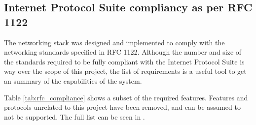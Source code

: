 \subsection{Internet Protocol Suite compliancy as per RFC 1122}
The networking stack was designed and implemented to comply with the networking
standards specified in RFC 1122. Although the number and size of the standards
required to be fully compliant with the Internet Protocol Suite is way over the
scope of this project, the list of requirements is a useful tool to get an
summary of the capabilities of the system.

Table \ref{tab:rfc_compliance} shows a subset of the required features.
Features and protocols unrelated to this project have been removed, and can be
assumed to not be supported. The full list can be seen in \cite[Section 3.5,
Page 72]{RFC1122}.
    \onecolumn
